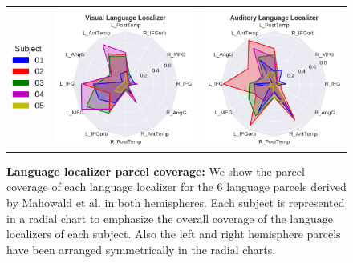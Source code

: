 \begin{figure}[ht]
\scriptsize
\hspace{-4ex}
\begin{tabular}{ccc}
{\includegraphics[width=0.1\linewidth]{figures/part_II/subjects_legend.pdf}}
\hspace{-1ex}
&{\includegraphics[width=0.45\linewidth]{figures/part_II/visual_langloc_radial.png}}
\hspace{-1ex}
&{\includegraphics[width=0.45\linewidth]{figures/part_II/auditory_langloc_radial.png}}
\hspace{-1ex}\\
\end{tabular}
\caption{\textbf{Language localizer parcel coverage:}
We show the parcel coverage of each language localizer for the 6 language parcels derived by Mahowald et al. in both hemispheres.
Each subject is represented in a radial chart to emphasize the overall coverage of the language localizers of each subject.
Also the left and right hemisphere parcels have been arranged symmetrically in the radial charts.}
\label{fig:language_localizers_radial}
\end{figure}

